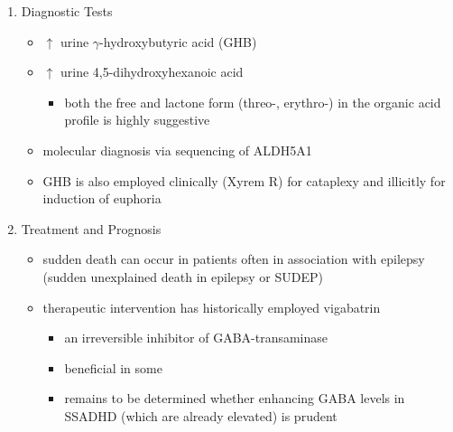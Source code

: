 \documentclass[12pt]{scrartcl}
\begin{document}
\begin{enumerate}
\item Diagnostic Tests
\label{sec:org237de19}
\begin{itemize}
\item \(\uparrow\) urine \(\gamma\)-hydroxybutyric acid (GHB)
\item \(\uparrow\) urine 4,5-dihydroxyhexanoic acid
\begin{itemize}
\item both the free and lactone form (threo-, erythro-) in the organic acid profile
is highly suggestive
\end{itemize}
\item molecular diagnosis via sequencing of ALDH5A1
\item GHB is also employed clinically (Xyrem R) for cataplexy and
illicitly for induction of euphoria
\end{itemize}

\item Treatment and Prognosis
\label{sec:org6e59227}
\begin{itemize}
\item sudden death can occur in patients often in association with
epilepsy (sudden unexplained death in epilepsy or SUDEP)
\item therapeutic intervention has historically employed vigabatrin
\begin{itemize}
\item an irreversible inhibitor of GABA-transaminase
\item beneficial in some
\item remains to be determined whether enhancing GABA levels in SSADHD
(which are already elevated) is prudent
\end{itemize}
\end{itemize}
\end{enumerate}
\end{document}
